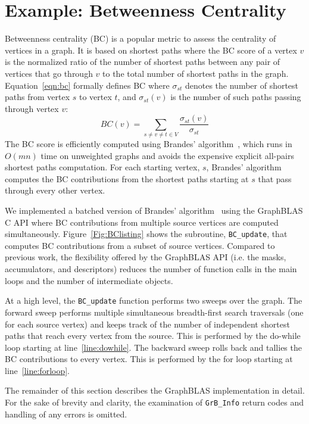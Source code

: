 \section{Example: Betweenness Centrality}
\label{sec:example}

Betweenness centrality (BC) is a popular metric to assess the centrality of 
vertices in a graph. It is based on shortest paths where the BC score of a
vertex $v$ is the normalized ratio of the number of shortest paths between 
any pair of vertices that go through $v$ to the total number of shortest paths 
in the graph.  Equation~\ref{eqn:bc} formally defines BC where $\sigma_{st}$ 
denotes the number of shortest paths from vertex $s$ to vertex $t$, and 
$\sigma_{st}(v)$ is the number of such paths passing through vertex $v$:
\begin{equation}
	BC(v) = \sum_{s \neq v \neq t \in V} \frac{\sigma_{st}(v)}{\sigma_{st}}
\label{eqn:bc}
\end{equation}
The BC score is efficiently computed using Brandes' 
algorithm~\cite{brandes2001faster}, 
which runs in $O(mn)$ time on unweighted graphs and avoids the expensive 
explicit all-pairs shortest paths computation.  For each starting vertex, $s$, 
Brandes' algorithm computes the BC contributions from the shortest paths starting
at $s$ that pass through every other vertex.

We implemented a batched version of Brandes' 
algorithm~\cite{combblas,bader2006designing,robinson2011complex} using 
the GraphBLAS C API where BC contributions from multiple 
source vertices are computed simultaneously. 
Figure~\ref{Fig:BClisting} shows the subroutine, {\tt BC\_update}, that computes
BC contributions from a subset of source vertices. Compared to previous work, the 
flexibility offered by the GraphBLAS API (i.e. the masks, accumulators, 
and descriptors) reduces  the number of function calls in the main loops and the
number of intermediate objects.

At a high level, the {\tt BC\_update} function performs two sweeps over the 
graph. The forward sweep performs multiple simultaneous
breadth-first search traversals (one for each source vertex) and keeps track 
of the number of independent shortest paths that reach every vertex from 
the source.  This is performed by the do-while loop starting at 
line~\ref{line:dowhile}. The backward sweep rolls back and tallies the BC 
contributions to every vertex. This is performed by the for loop starting 
at line~\ref{line:forloop}.  

The remainder of this section describes the 
GraphBLAS implementation in detail.  
For the sake of brevity and clarity, the examination of 
{\tt GrB\_Info} return codes and handling of any errors is omitted.


